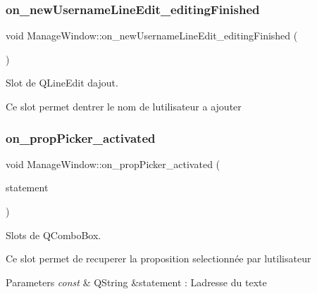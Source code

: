 \subsubsection{\texorpdfstring{on\+\_\+new\+Username\+Line\+Edit\+\_\+editing\+Finished}{on\_newUsernameLineEdit\_editingFinished}}
{\footnotesize\ttfamily void Manage\+Window\+::on\+\_\+new\+Username\+Line\+Edit\+\_\+editing\+Finished (\begin{DoxyParamCaption}{ }\end{DoxyParamCaption})\hspace{0.3cm}{\ttfamily [slot]}}



Slot de Q\+Line\+Edit d\textquotesingle{}ajout. 

Ce slot permet d\textquotesingle{}entrer le nom de l\textquotesingle{}utilisateur a ajouter \mbox{\label{classManageWindow_ac4bafce26b6113a4490f5609e8cdd17b}} 
\subsubsection{\texorpdfstring{on\+\_\+prop\+Picker\+\_\+activated}{on\_propPicker\_activated}}
{\footnotesize\ttfamily void Manage\+Window\+::on\+\_\+prop\+Picker\+\_\+activated (\begin{DoxyParamCaption}\item[{const Q\+String \&}]{statement }\end{DoxyParamCaption})\hspace{0.3cm}{\ttfamily [slot]}}



Slots de Q\+Combo\+Box. 

Ce slot permet de recuperer la proposition selectionnée par l\textquotesingle{}utilisateur 
\begin{DoxyParams}{Parameters}
{\em const} & Q\+String \&statement \+: L\textquotesingle{}adresse du texte \\
\hline
\end{DoxyParams}
\mbox{\label{classManageWindow_ab8ca1c057dcd2d277a3540a66cd9145c}} 
